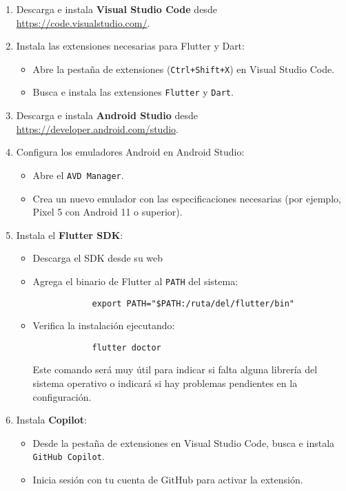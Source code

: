 \begin{enumerate}
	\item Descarga e instala \textbf{Visual Studio Code} desde \url{https://code.visualstudio.com/}.
	\item Instala las extensiones necesarias para Flutter y Dart:
	\begin{itemize}
		\item Abre la pestaña de extensiones (\texttt{Ctrl+Shift+X}) en Visual Studio Code.
		\item Busca e instala las extensiones \texttt{Flutter} y \texttt{Dart}.
	\end{itemize}
	\item Descarga e instala \textbf{Android Studio} desde \url{https://developer.android.com/studio}.
	\item Configura los emuladores Android en Android Studio:
	\begin{itemize}
		\item Abre el \texttt{AVD Manager}.
		\item Crea un nuevo emulador con las especificaciones necesarias (por ejemplo, Pixel 5 con Android 11 o superior).
	\end{itemize}
	\item Instala el \textbf{Flutter SDK}:
	\begin{itemize}
		\item Descarga el SDK desde su web \cite{flutter_install}
		\item Agrega el binario de Flutter al \texttt{PATH} del sistema:
		\begin{verbatim}
			export PATH="$PATH:/ruta/del/flutter/bin"
		\end{verbatim}
		\item Verifica la instalación ejecutando:
		\begin{verbatim}
			flutter doctor
		\end{verbatim}
		Este comando será muy útil para indicar si falta alguna librería del sistema operativo o indicará si hay problemas pendientes en la configuración.
	\end{itemize}
	\item Instala \textbf{Copilot}:
	\begin{itemize}
		\item Desde la pestaña de extensiones en Visual Studio Code, busca e instala \texttt{GitHub Copilot}.
		\item Inicia sesión con tu cuenta de GitHub para activar la extensión.
	\end{itemize}
\end{enumerate}
